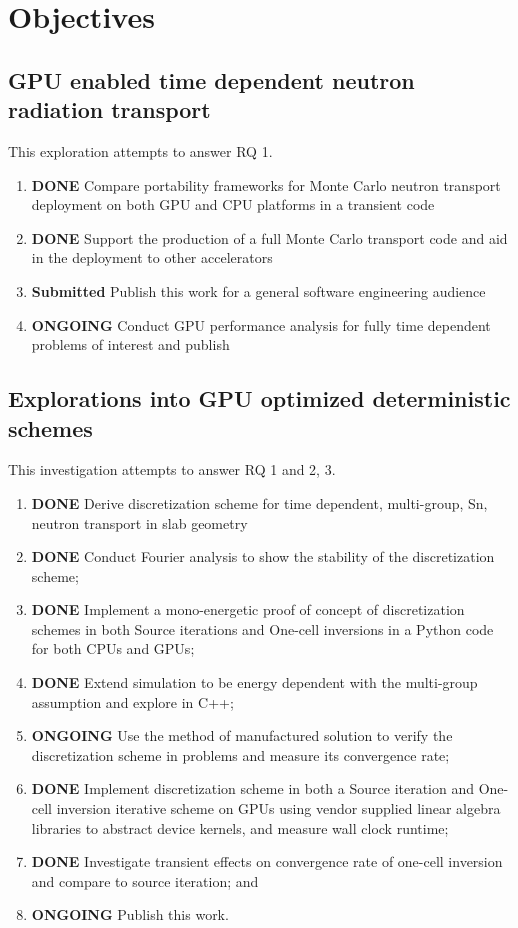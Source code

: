 \chapter{Objectives}
\label{ch:objectives}

\section{GPU enabled time dependent neutron radiation transport}
This exploration attempts to answer RQ 1.
\begin{enumerate}
    \item \textbf{DONE} Compare portability frameworks for Monte Carlo neutron transport deployment on both GPU and CPU platforms in a transient code
    \item \textbf{DONE} Support the production of a full Monte Carlo transport code and aid in the deployment to other accelerators
    \item \textbf{Submitted} Publish this work for a general software engineering audience
    \item \textbf{ONGOING} Conduct GPU performance analysis for fully time dependent problems of interest and publish
\end{enumerate}


\section{Explorations into GPU optimized deterministic schemes}
This investigation attempts to answer RQ 1 and 2, 3.
\begin{enumerate}
    \item \textbf{DONE} Derive discretization scheme for time dependent, multi-group, Sn, neutron transport in slab geometry
    \item \textbf{DONE} Conduct Fourier analysis to show the stability of the discretization scheme;
    \item \textbf{DONE} Implement a mono-energetic proof of concept of discretization schemes in both Source iterations and One-cell inversions in a Python code for both CPUs and GPUs;
    \item \textbf{DONE} Extend simulation to be energy dependent with the multi-group assumption and explore in C++;
    \item \textbf{ONGOING} Use the method of manufactured solution to verify the discretization scheme in problems and measure its convergence rate;
    \item \textbf{DONE} Implement discretization scheme in both a Source iteration and One-cell inversion iterative scheme on GPUs using vendor supplied linear algebra libraries to abstract device kernels, and measure wall clock runtime; 
    \item \textbf{DONE} Investigate transient effects on convergence rate of one-cell inversion and compare to source iteration; and
    \item \textbf{ONGOING} Publish this work.
\end{enumerate}

